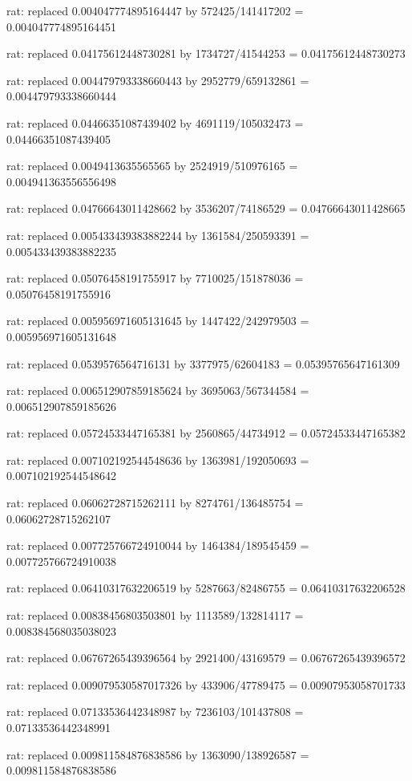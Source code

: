 \documentclass[a4paper,10pt]{article}
\begin{document}
\begin{eulernotebook}
\begin{eulercomment}
\begin{eulercomment}
\begin{eulercomment}
\begin{eulercomment}
\begin{eulercomment}
\begin{eulercomment}
\begin{eulercomment}
\begin{eulercomment}
\begin{eulercomment}
\begin{eulercomment}
\begin{eulercomment}
\begin{eulercomment}
\begin{eulercomment}
\begin{eulercomment}
\begin{eulercomment}
\begin{eulercomment}
\begin{euleroutput}
  rat: replaced 0.004047774895164447 by 572425/141417202 = 0.004047774895164451
  
  rat: replaced 0.04175612448730281 by 1734727/41544253 = 0.04175612448730273
  
  rat: replaced 0.004479793338660443 by 2952779/659132861 = 0.004479793338660444
  
  rat: replaced 0.04466351087439402 by 4691119/105032473 = 0.04466351087439405
  
  rat: replaced 0.0049413635565565 by 2524919/510976165 = 0.004941363556556498
  
  rat: replaced 0.04766643011428662 by 3536207/74186529 = 0.04766643011428665
  
  rat: replaced 0.005433439383882244 by 1361584/250593391 = 0.005433439383882235
  
  rat: replaced 0.05076458191755917 by 7710025/151878036 = 0.05076458191755916
  
  rat: replaced 0.005956971605131645 by 1447422/242979503 = 0.005956971605131648
  
  rat: replaced 0.0539576564716131 by 3377975/62604183 = 0.05395765647161309
  
  rat: replaced 0.006512907859185624 by 3695063/567344584 = 0.006512907859185626
  
  rat: replaced 0.05724533447165381 by 2560865/44734912 = 0.05724533447165382
  
  rat: replaced 0.007102192544548636 by 1363981/192050693 = 0.007102192544548642
  
  rat: replaced 0.06062728715262111 by 8274761/136485754 = 0.06062728715262107
  
  rat: replaced 0.007725766724910044 by 1464384/189545459 = 0.007725766724910038
  
  rat: replaced 0.06410317632206519 by 5287663/82486755 = 0.06410317632206528
  
  rat: replaced 0.00838456803503801 by 1113589/132814117 = 0.008384568035038023
  
  rat: replaced 0.06767265439396564 by 2921400/43169579 = 0.06767265439396572
  
  rat: replaced 0.009079530587017326 by 433906/47789475 = 0.00907953058701733
  
  rat: replaced 0.07133536442348987 by 7236103/101437808 = 0.07133536442348991
  
  rat: replaced 0.009811584876838586 by 1363090/138926587 = 0.009811584876838586
  

\end{euleroutput}
\end{eulercomment}
\end{eulercomment}
\end{eulercomment}
\end{eulercomment}
\end{eulercomment}
\end{eulercomment}
\end{eulercomment}
\end{eulercomment}
\end{eulercomment}
\end{eulercomment}
\end{eulercomment}
\end{eulercomment}
\end{eulercomment}
\end{eulercomment}
\end{eulercomment}
\end{eulercomment}
\end{eulernotebook}
\end{document}
